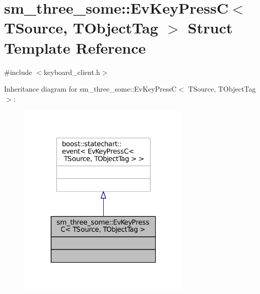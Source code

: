\hypertarget{structsm__three__some_1_1EvKeyPressC}{}\section{sm\+\_\+three\+\_\+some\+:\+:Ev\+Key\+PressC$<$ T\+Source, T\+Object\+Tag $>$ Struct Template Reference}
\label{structsm__three__some_1_1EvKeyPressC}


{\ttfamily \#include $<$keyboard\+\_\+client.\+h$>$}



Inheritance diagram for sm\+\_\+three\+\_\+some\+:\+:Ev\+Key\+PressC$<$ T\+Source, T\+Object\+Tag $>$\+:
\nopagebreak
\begin{figure}[H]
\begin{center}
\leavevmode
\includegraphics[width=235pt]{structsm__three__some_1_1EvKeyPressC__inherit__graph}
\end{center}
\end{figure}


